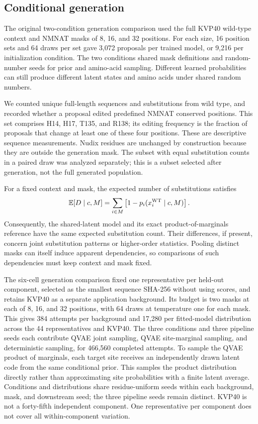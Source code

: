 \documentclass[referee,pdflatex,sn-vancouver-num]{sn-jnl}
\begin{document}
\subsection{Conditional generation}
The original two-condition generation comparison used the full KVP40 wild-type context and NMNAT masks of 8, 16, and 32 positions. For each size, 16 position sets and 64 draws per set gave 3,072 proposals per trained model, or 9,216 per initialization condition. The two conditions shared mask definitions and random-number seeds for prior and amino-acid sampling. Different learned probabilities can still produce different latent states and amino acids under shared random numbers.

We counted unique full-length sequences and substitutions from wild type, and recorded whether a proposal edited predefined NMNAT conserved positions. This set comprises H14, H17, T135, and R138; its editing frequency is the fraction of proposals that change at least one of these four positions. These are descriptive sequence measurements. Nudix residues are unchanged by construction because they are outside the generation mask. The subset with equal substitution counts in a paired draw was analyzed separately; this is a subset selected after generation, not the full generated population.

For a fixed context and mask, the expected number of substitutions satisfies
\begin{equation}
 \mathbb{E}[D\mid c,M]=\sum_{i\in M}\left[1-p_i(x_i^{\rm WT}\mid c,M)\right].
\label{eq:hamming}
\end{equation}
Consequently, the shared-latent model and its exact product-of-marginals reference have the same expected substitution count. Their differences, if present, concern joint substitution patterns or higher-order statistics. Pooling distinct masks can itself induce apparent dependencies, so comparisons of such dependencies must keep context and mask fixed.

The six-cell generation comparison fixed one representative per held-out component, selected as the smallest sequence SHA-256 without using scores, and retains KVP40 as a separate application background. Its budget is two masks at each of 8, 16, and 32 positions, with 64 draws at temperature one for each mask. This gives 384 attempts per background and 17,280 per fitted-model distribution across the 44 representatives and KVP40. The three conditions and three pipeline seeds each contribute QVAE joint sampling, QVAE site-marginal sampling, and deterministic sampling, for 466,560 completed attempts. To sample the QVAE product of marginals, each target site receives an independently drawn latent code from the same conditional prior. This samples the product distribution directly rather than approximating site probabilities with a finite latent average. Conditions and distributions share residue-uniform seeds within each background, mask, and downstream seed; the three pipeline seeds remain distinct. KVP40 is not a forty-fifth independent component. One representative per component does not cover all within-component variation.
\end{document}
